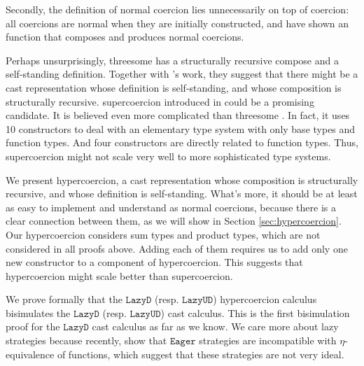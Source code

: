 \documentclass[acmsmall,review,anonymous]{acmart}\settopmatter{printfolios=true,printccs=false,printacmref=false}
\newcommand{\lazyUD}{$\mathtt{Lazy UD}$}
\newcommand{\lazyD}{$\mathtt{Lazy D}$}
\newcommand{\eager}{$\mathtt{Eager}$}
\begin{document}
Secondly, the definition of normal coercion lies unnecessarily on top 
of coercion: all coercions are normal when they are initially constructed, and 
\citet{siek2012interpretations} have shown an function that 
composes and produces normal coercions.
%

Perhaps unsurprisingly, threesome has a structurally recursive compose and a 
self-standing definition. Together with \citet{garcia2013calculating}'s 
work, they suggest that there might be a cast representation whose definition 
is self-standing, and whose composition is structurally recursive. 
supercoercion introduced in \citet{garcia2013calculating} could be a promising 
candidate. It is believed even more complicated than threesome 
\cite{siek2015blame}. In fact, it uses 10 constructors to deal with an 
elementary type system with only base types and 
function types. And four constructors are directly related to function types. 
Thus, supercoercion might not scale very well to more sophisticated type 
systems. 

We present hypercoercion, a cast representation whose composition is 
structurally recursive, and whose definition is self-standing. What's more, it 
should be at 
least as easy to implement and understand as normal coercions, because there is 
a clear connection between them, as we will show in Section 
\ref{sec:hypercoercion}.
Our hypercoercion considers sum types and product types, which are not 
considered in all proofs above. Adding each of them requires us to add only one 
new constructor to a component of hypercoercion. This suggests that 
hypercoercion might scale better than supercoercion.

We prove formally that the \lazyD{} (resp. \lazyUD{}) hypercoercion calculus 
bisimulates the \lazyD{} (resp. \lazyUD{}) cast calculus. This is 
the first bisimulation proof for the \lazyD{} cast calculus as far as we know.
We care more about lazy strategies because recently, \citet{new2019gradual} 
show that \eager{} strategies are incompatible with $\eta$-equivalence of 
functions, which suggest that these strategies are not very ideal. 
\todo[inline]{Explain why we care about \lazyD{} and \lazyUD{}. -Jeremy}
\end{document}
